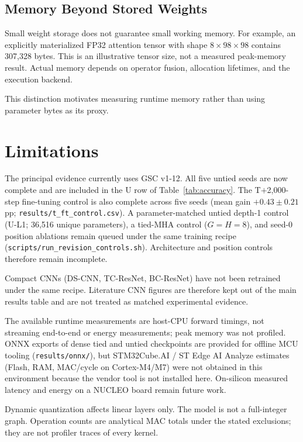 \documentclass[journal]{IEEEtran}
\begin{document}
\subsection{Memory Beyond Stored Weights}

Small weight storage does not guarantee small working memory.
For example, an explicitly materialized FP32 attention tensor
with shape $8\times98\times98$ contains 307,328 bytes.
This is an illustrative tensor size, not a measured peak-memory
result.
Actual memory depends on operator fusion, allocation lifetimes,
and the execution backend.

This distinction motivates measuring runtime memory rather than
using parameter bytes as its proxy.

\section{Limitations}

The principal evidence currently uses GSC v1-12.
All five untied seeds are now complete and are included in the U row
of Table~\ref{tab:accuracy}.
The T$+$2{,}000-step fine-tuning control is also complete across
five seeds (mean gain $+0.43\pm0.21$ pp; \texttt{results/t\_ft\_control.csv}).
A parameter-matched
untied depth-1 control (U-L1; 36{,}516 unique parameters), a tied-MHA
control ($G{=}H{=}8$), and seed-0 position ablations remain queued under the
same training recipe
(\texttt{scripts/run\_revision\_controls.sh}).
Architecture and position controls therefore remain incomplete.

Compact CNNs (DS-CNN, TC-ResNet, BC-ResNet) have not been
retrained under the same recipe.
Literature CNN figures are therefore kept out of the main results
table and are not treated as matched experimental evidence.

The available runtime measurements are host-CPU forward timings,
not streaming end-to-end or energy measurements; peak memory was
not profiled.
ONNX exports of dense tied and untied checkpoints are provided for
offline MCU tooling (\texttt{results/onnx/}), but
STM32Cube.AI / ST Edge AI Analyze estimates (Flash, RAM, MAC/cycle
on Cortex-M4/M7) were not obtained in this environment because the
vendor tool is not installed here.
On-silicon measured latency and energy on a NUCLEO board remain
future work.

Dynamic quantization affects linear layers only.
The model is not a full-integer graph.
Operation counts are analytical MAC totals under the stated
exclusions; they are not profiler traces of every kernel.
\end{document}
